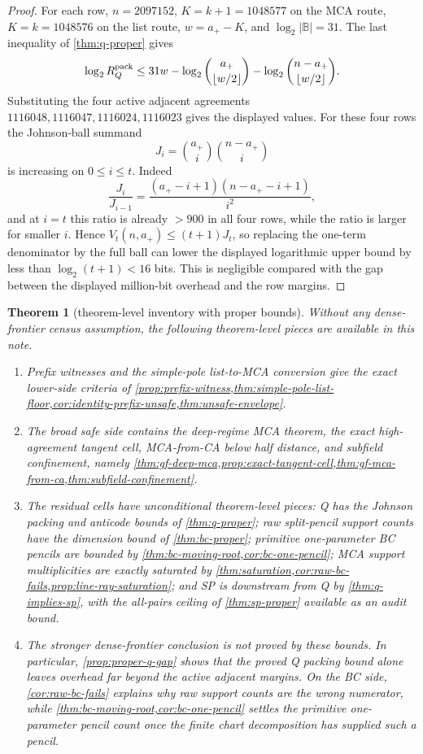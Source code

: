 \documentclass[a4paper,11pt]{amsart}
\newtheorem{theorem}{Theorem}[section]
\theoremstyle{remark}
\newcommand{\B}{\mathbb B}
\begin{document}
\begin{proof}
For each row, \(n=2097152\), \(K=k+1=1048577\) on the MCA route, \(K=k=1048576\) on the list route, \(w=a_+-K\), and \(\log_2|\B|=31\).  The last inequality of \cref{thm:q-proper} gives
\[
        \log_2 R_Q^{\rm pack}
        \le
        31w-\log_2\binom{a_+}{\lfloor w/2\rfloor}
             -\log_2\binom{n-a_+}{\lfloor w/2\rfloor}.
\]
Substituting the four active adjacent agreements \(1116048,1116047,1116024,1116023\) gives the displayed values.  For these four rows the Johnson-ball summand
\[
        J_i=\binom{a_+}{i}\binom{n-a_+}{i}
\]
is increasing on \(0\le i\le t\).  Indeed
\[
        \frac{J_i}{J_{i-1}}
        =
        \frac{(a_+-i+1)(n-a_+-i+1)}{i^2},
\]
and at \(i=t\) this ratio is already \(>900\) in all four rows, while the ratio is larger for smaller \(i\).  Hence \(V_t(n,a_+)\le(t+1)J_t\), so replacing the one-term denominator by the full ball can lower the displayed logarithmic upper bound by less than \(\log_2(t+1)<16\) bits.  This is negligible compared with the gap between the displayed million-bit overhead and the row margins.
\end{proof}

\begin{theorem}[theorem-level inventory with proper bounds]\label{thm:proper-inventory}
Without any dense-frontier census assumption, the following theorem-level pieces are available in this note.
\begin{enumerate}[label=\textup{(\roman*)}]
\item Prefix witnesses and the simple-pole list-to-MCA conversion give the exact lower-side criteria of \cref{prop:prefix-witness,thm:simple-pole-list-floor,cor:identity-prefix-unsafe,thm:unsafe-envelope}.
\item The broad safe side contains the deep-regime MCA theorem, the exact high-agreement tangent cell, MCA-from-CA below half distance, and subfield confinement, namely \cref{thm:gf-deep-mca,prop:exact-tangent-cell,thm:gf-mca-from-ca,thm:subfield-confinement}.
\item The residual cells have unconditional theorem-level pieces: Q has the Johnson packing and anticode bounds of \cref{thm:q-proper}; raw split-pencil support counts have the dimension bound of \cref{thm:bc-proper}; primitive one-parameter BC pencils are bounded by \cref{thm:bc-moving-root,cor:bc-one-pencil}; MCA support multiplicities are exactly saturated by \cref{thm:saturation,cor:raw-bc-fails,prop:line-ray-saturation}; and SP is downstream from Q by \cref{thm:q-implies-sp}, with the all-pairs ceiling of \cref{thm:sp-proper} available as an audit bound.
\item The stronger dense-frontier conclusion is not proved by these bounds.  In particular, \cref{prop:proper-q-gap} shows that the proved Q packing bound alone leaves overhead far beyond the active adjacent margins.  On the BC side, \cref{cor:raw-bc-fails} explains why raw support counts are the wrong numerator, while \cref{thm:bc-moving-root,cor:bc-one-pencil} settles the primitive one-parameter pencil count once the finite chart decomposition has supplied such a pencil.
\end{enumerate}
\end{theorem}
\end{document}
